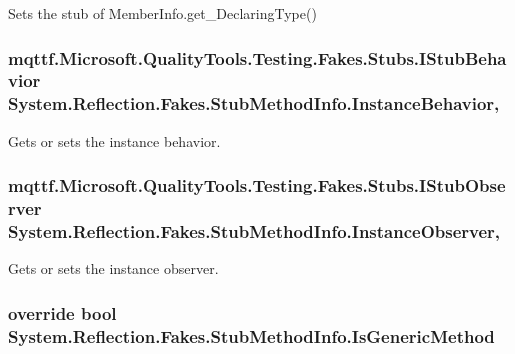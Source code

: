 Sets the stub of Member\-Info.\-get\-\_\-\-Declaring\-Type()

\hypertarget{class_system_1_1_reflection_1_1_fakes_1_1_stub_method_info_a6ee8d49367112d766d2377785673ca8f}{
\subsubsection[{Instance\-Behavior}]{\setlength{\rightskip}{0pt plus 5cm}mqttf.\-Microsoft.\-Quality\-Tools.\-Testing.\-Fakes.\-Stubs.\-I\-Stub\-Behavior System.\-Reflection.\-Fakes.\-Stub\-Method\-Info.\-Instance\-Behavior\hspace{0.3cm}{\ttfamily [get]}, {\ttfamily [set]}}}\label{class_system_1_1_reflection_1_1_fakes_1_1_stub_method_info_a6ee8d49367112d766d2377785673ca8f}


Gets or sets the instance behavior.

\hypertarget{class_system_1_1_reflection_1_1_fakes_1_1_stub_method_info_a765fbf5ee01efb1441f38d708354b5c2}{
\subsubsection[{Instance\-Observer}]{\setlength{\rightskip}{0pt plus 5cm}mqttf.\-Microsoft.\-Quality\-Tools.\-Testing.\-Fakes.\-Stubs.\-I\-Stub\-Observer System.\-Reflection.\-Fakes.\-Stub\-Method\-Info.\-Instance\-Observer\hspace{0.3cm}{\ttfamily [get]}, {\ttfamily [set]}}}\label{class_system_1_1_reflection_1_1_fakes_1_1_stub_method_info_a765fbf5ee01efb1441f38d708354b5c2}


Gets or sets the instance observer.

\hypertarget{class_system_1_1_reflection_1_1_fakes_1_1_stub_method_info_a4f10a877770dc4b71a8d9ec8a5cbb2b7}{
\subsubsection[{Is\-Generic\-Method}]{\setlength{\rightskip}{0pt plus 5cm}override bool System.\-Reflection.\-Fakes.\-Stub\-Method\-Info.\-Is\-Generic\-Method\hspace{0.3cm}{\ttfamily [get]}}}\label{class_system_1_1_reflection_1_1_fakes_1_1_stub_method_info_a4f10a877770dc4b71a8d9ec8a5cbb2b7}


